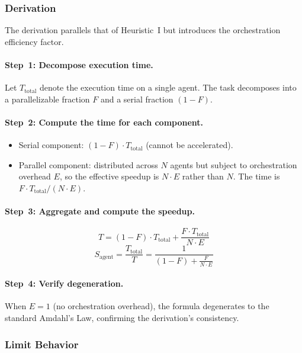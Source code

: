 \subsubsection{Derivation}

The derivation parallels that of Heuristic~I but introduces the orchestration efficiency factor.

\paragraph{Step~1: Decompose execution time.}
Let $T_{\mathrm{total}}$ denote the execution time on a single agent. The task decomposes into a parallelizable fraction $F$ and a serial fraction $(1-F)$.

\paragraph{Step~2: Compute the time for each component.}
\begin{itemize}[nosep]
\item Serial component: $(1-F) \cdot T_{\mathrm{total}}$ (cannot be accelerated).
\item Parallel component: distributed across $N$ agents but subject to orchestration overhead $E$, so the effective speedup is $N \cdot E$ rather than $N$. The time is $F \cdot T_{\mathrm{total}} / (N \cdot E)$.
\end{itemize}

\paragraph{Step~3: Aggregate and compute the speedup.}
\begin{equation}
T = (1-F) \cdot T_{\mathrm{total}} + \frac{F \cdot T_{\mathrm{total}}}{N \cdot E}
\end{equation}
\begin{equation}
S_{\mathrm{agent}} = \frac{T_{\mathrm{total}}}{T} = \frac{1}{(1-F) + \frac{F}{N \cdot E}}
\end{equation}

\paragraph{Step~4: Verify degeneration.}
When $E = 1$ (no orchestration overhead), the formula degenerates to the standard Amdahl's Law, confirming the derivation's consistency.

\subsubsection{Limit Behavior}

